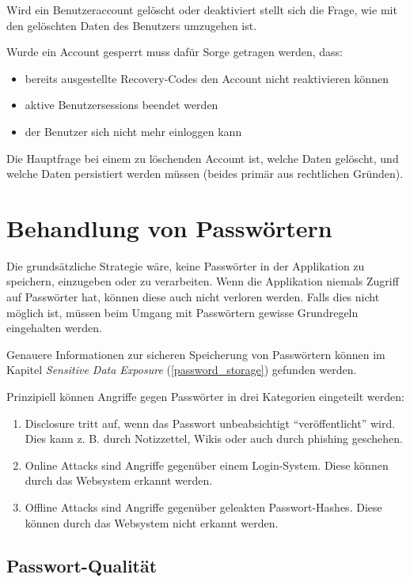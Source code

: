 Wird ein Benutzeraccount gelöscht oder deaktiviert stellt sich die Frage, wie mit den gelöschten Daten des Benutzers umzugehen ist.

Wurde ein Account gesperrt muss dafür Sorge getragen werden, dass:

\begin{itemize}
	\item bereits ausgestellte Recovery-Codes den Account nicht reaktivieren können
	\item aktive Benutzersessions beendet werden
	\item der Benutzer sich nicht mehr einloggen kann
\end{itemize}

Die Hauptfrage bei einem zu löschenden Account ist, welche Daten gelöscht, und welche Daten persistiert werden müssen (beides primär aus rechtlichen Gründen).

\section{Behandlung von Passwörtern}

Die grundsätzliche Strategie wäre, keine Passwörter in der Applikation zu speichern, einzugeben oder zu verarbeiten. Wenn die Applikation niemals Zugriff auf Passwörter hat, können diese auch nicht verloren werden. Falls dies nicht möglich ist, müssen beim Umgang mit Passwörtern gewisse Grundregeln eingehalten werden.

Genauere Informationen zur sicheren Speicherung von Passwörtern können im Kapitel \textit{Sensitive Data Exposure} (\ref{password_storage}) gefunden werden.

Prinzipiell können Angriffe gegen Passwörter in drei Kategorien eingeteilt werden:

\begin{enumerate}
	\item Disclosure tritt auf, wenn das Passwort unbeabsichtigt ``veröffentlicht'' wird. Dies kann z. B. durch Notizzettel, Wikis oder auch durch phishing geschehen.
	\item Online Attacks sind Angriffe gegenüber einem Login-System. Diese können durch das Websystem erkannt werden.
	\item Offline Attacks sind Angriffe gegenüber geleakten Passwort-Hashes. Diese können durch das Websystem nicht erkannt werden.
\end{enumerate}

\subsection{Passwort-Qualität}

